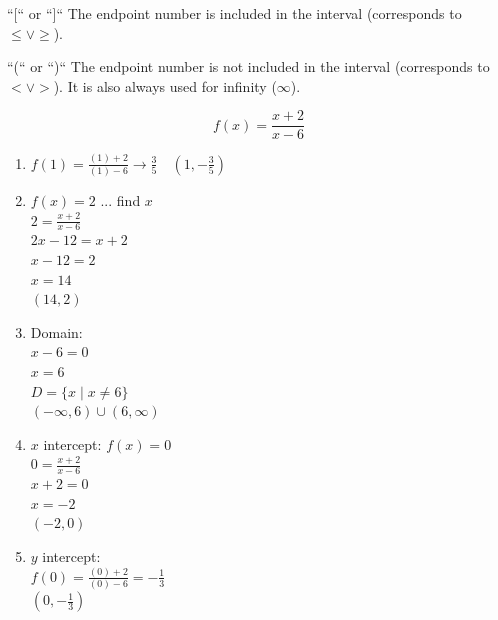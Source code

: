 \begin{definition}
	``[`` or ``]`` The endpoint number is included in the interval (corresponds to $\le \lor \ge$).
\end{definition}

\begin{definition}
	``(`` or ``)`` The endpoint number is not included in the interval (corresponds to $< \lor >$). It is also always used for infinity ($\infty$).
\end{definition}

\begin{example}[Algebraic]
	$$f(x) = \frac{x + 2}{x - 6}$$
	\begin{enumerate}
		\item $f(1) = \frac{(1) + 2}{(1)- 6} \to \frac{3}{5} \quad \left(1, -\frac{3}{5}\right)$
		\item $f(x) = 2$ ... find $x$\\
		$2 = \frac{x + 2}{x - 6}$ \\
		$2x - 12 = x + 2$ \\
		$x - 12 = 2$ \\
		$x = 14$ \\
		$(14, 2)$
		\item Domain: \\
		$x - 6 = 0$ \\
		$x = 6$\\
		$D = \{x \mid x \ne 6\}$ \\
		$(-\infty, 6) \cup (6, \infty)$
		\item $x$ intercept:
		$f(x) = 0$ \\
		$0 = \frac{x + 2}{x - 6}$ \\
		$x + 2 = 0$ \\
		$x = -2$ \\
		$(-2, 0)$
		\item $y$ intercept: \\
		$f(0) = \frac{(0) + 2}{(0) - 6} = -\frac{1}{3}$ \\
		$\left(0, -\frac{1}{3}\right)$
	\end{enumerate}
\end{example}
